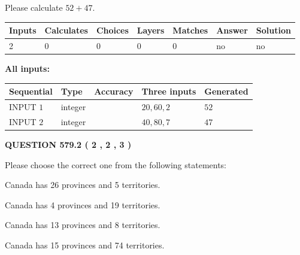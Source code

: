 \documentclass[12pt]{article}
\begin{document}
  
 
Please calculate $ %
52 +  %
47 $.
 
 
   
   
   
   
\noindent\begin{tabular}{|l|l|l|l|l|l|l|}
 \hline
Inputs & Calculates & Choices & Layers & Matches & Answer & Solution \\ \hline
 2  & 
 0  & 
 0
  & 
 0  & 
 0  & 
  no & 
  no 
  \\ \hline
 \end{tabular}
   
   
   
   
\noindent{}
   
   
   
   
\noindent\vspace{0.1in}\hspace{-0.08in} {\textbf{\Large{All inputs: }}}
   
   
  
  
\noindent\begin{tabular}{|l|l|l|l|l|}
\hline
 Sequential & Type & Accuracy & Three inputs & Generated \\ 
\hline
 
 
  INPUT $  1 $ & integer &  & $
 20
 , 
 60
 , 
 2
 $ & $ 52 $ 
 \\  \hline  
 
 
  INPUT $  2 $ & integer &  & $
 40
 , 
 80
 , 
 7
 $ & $ 47 $ 
 \\  \hline  
 \end{tabular}
   
   
  
\vspace{0.2in}
  
{\textbf{\Large{QUESTION
579.2 
 ( 2 , 2 , 3 )
}}}
  
  
Please choose the correct one from the following statements:
 
 
Canada has  26 provinces and  5 territories.
 
 
Canada has   4 provinces and  19 territories.
 
 
Canada has  13 provinces and  8 territories.
 
 
Canada has  15 provinces and  74 territories.
 
\end{document}
